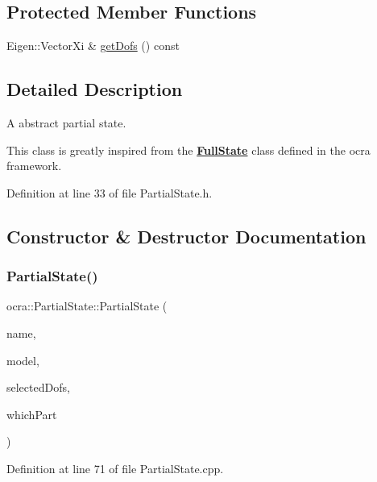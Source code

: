 \subsection*{Protected Member Functions}
\begin{DoxyCompactItemize}
\item 
Eigen\+::\+Vector\+Xi \& \hyperlink{classocra_1_1PartialState_a969bb0d941f73df7da78aba4339908c4}{get\+Dofs} () const
\end{DoxyCompactItemize}


\subsection{Detailed Description}
A abstract partial state. 

This class is greatly inspired from the {\bfseries \hyperlink{classocra_1_1FullState}{Full\+State}} class defined in the ocra framework. 

Definition at line 33 of file Partial\+State.\+h.



\subsection{Constructor \& Destructor Documentation}
\hypertarget{classocra_1_1PartialState_ab6f225c821033965da2ccd5924c23915}{}\label{classocra_1_1PartialState_ab6f225c821033965da2ccd5924c23915} 
\subsubsection{\texorpdfstring{Partial\+State()}{PartialState()}}
{\footnotesize\ttfamily ocra\+::\+Partial\+State\+::\+Partial\+State (\begin{DoxyParamCaption}\item[{const std\+::string \&}]{name,  }\item[{const \hyperlink{classocra_1_1Model}{Model} \&}]{model,  }\item[{const Eigen\+::\+Vector\+Xi \&}]{selected\+Dofs,  }\item[{int}]{which\+Part }\end{DoxyParamCaption})}



Definition at line 71 of file Partial\+State.\+cpp.

